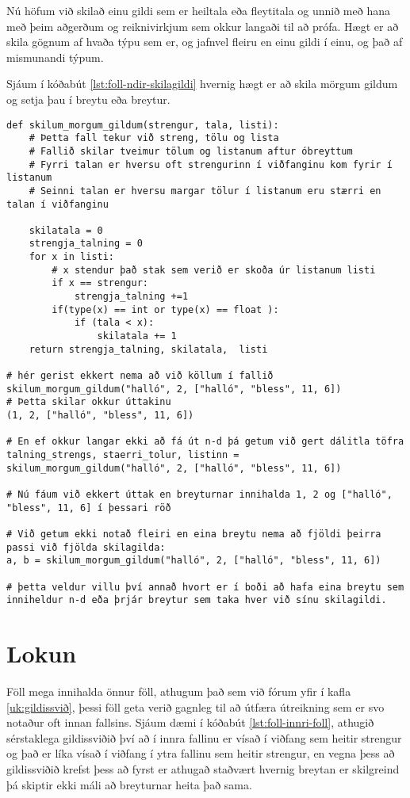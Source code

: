 Nú höfum við skilað einu gildi sem er heiltala eða fleytitala og unnið með hana með þeim aðgerðum og reiknivirkjum sem okkur langaði til að prófa.
Hægt er að skila gögnum af hvaða týpu sem er, og jafnvel fleiru en einu gildi í einu, og það af mismunandi týpum.

Sjáum í kóðabút \ref{lst:foll-ndir-skilagildi} hvernig hægt er að skila mörgum gildum og setja þau í breytu eða breytur.

\begin{lstlisting}[caption=Hvernig á að skila mörgum gildum, label=lst:foll-ndir-skilagildi]
def skilum_morgum_gildum(strengur, tala, listi):
	# Þetta fall tekur við streng, tölu og lista
	# Fallið skilar tveimur tölum og listanum aftur óbreyttum
	# Fyrri talan er hversu oft strengurinn í viðfanginu kom fyrir í listanum
	# Seinni talan er hversu margar tölur í listanum eru stærri en talan í viðfanginu
	
	skilatala = 0
	strengja_talning = 0
	for x in listi:
		# x stendur það stak sem verið er skoða úr listanum listi
		if x == strengur:
			strengja_talning +=1
		if(type(x) == int or type(x) == float ):
			if (tala < x):
				skilatala += 1
	return strengja_talning, skilatala,  listi
	
# hér gerist ekkert nema að við köllum í fallið
skilum_morgum_gildum("halló", 2, ["halló", "bless", 11, 6])
# Þetta skilar okkur úttakinu
(1, 2, ["halló", "bless", 11, 6])

# En ef okkur langar ekki að fá út n-d þá getum við gert dálitla töfra 
talning_strengs, staerri_tolur, listinn = skilum_morgum_gildum("halló", 2, ["halló", "bless", 11, 6])

# Nú fáum við ekkert úttak en breyturnar innihalda 1, 2 og ["halló", "bless", 11, 6] í þessari röð

# Við getum ekki notað fleiri en eina breytu nema að fjöldi þeirra passi við fjölda skilagilda:
a, b = skilum_morgum_gildum("halló", 2, ["halló", "bless", 11, 6])

# þetta veldur villu því annað hvort er í boði að hafa eina breytu sem inniheldur n-d eða þrjár breytur sem taka hver við sínu skilagildi.
\end{lstlisting}

\section{Lokun}

Föll mega innihalda önnur föll, athugum það sem við fórum yfir í kafla \ref{uk:gildissvið}, þessi föll geta verið gagnleg til að útfæra útreikning sem er svo notaður oft innan fallsins.
Sjáum dæmi í kóðabút \ref{lst:foll-innri-foll}, athugið sérstaklega gildissviðið því að í innra fallinu er vísað í viðfang sem heitir strengur og það er líka vísað í viðfang í ytra fallinu sem heitir strengur, en vegna þess að gildissviðið krefst þess að fyrst er athugað staðvært hvernig breytan er skilgreind þá skiptir ekki máli að breyturnar heita það sama.


